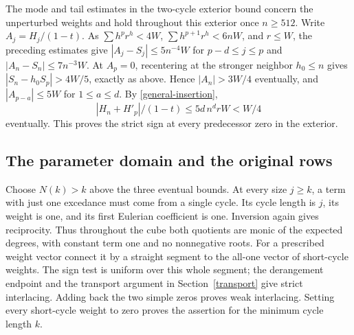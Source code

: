 The mode and tail estimates in the two-cycle exterior bound concern the unperturbed weights and hold throughout this exterior once \(n\ge512\). Write \(A_j=H_j/(1-t)\). As \(\sum h^p r^h<4W\), \(\sum h^{p+1}r^h<6nW\), and \(r\le W\), the preceding estimates give \(|A_j-S_j|\le5n^{-4}W\) for \(p-d\le j\le p\) and \(|A_n-S_n|\le7n^{-3}W\). At \(A_p=0\), recentering at the stronger neighbor \(h_0\le n\) gives \(|S_n-h_0S_p|>4W/5\), exactly as above. Hence \(|A_n|>3W/4\) eventually, and \(|A_{p-a}|\le5W\) for \(1\le a\le d\). By \eqref{general-insertion},
\[
 |H_n+H'_p|/(1-t)\le5d\,n^d rW<W/4
\]
eventually. This proves the strict sign at every predecessor zero in the exterior.

\subsection{The parameter domain and the original rows}
Choose \(N(k)>k\) above the three eventual bounds. At every size \(j\ge k\), a term with just one excedance must come from a single cycle. Its cycle length is \(j\), its weight is one, and its first Eulerian coefficient is one. Inversion again gives reciprocity. Thus throughout the cube both quotients are monic of the expected degrees, with constant term one and no nonnegative roots. For a prescribed weight vector connect it by a straight segment to the all-one vector of short-cycle weights. The sign test is uniform over this whole segment; the derangement endpoint and the transport argument in Section~\ref{transport} give strict interlacing. Adding back the two simple zeros proves weak interlacing. Setting every short-cycle weight to zero proves the assertion for the minimum cycle length \(k\).

